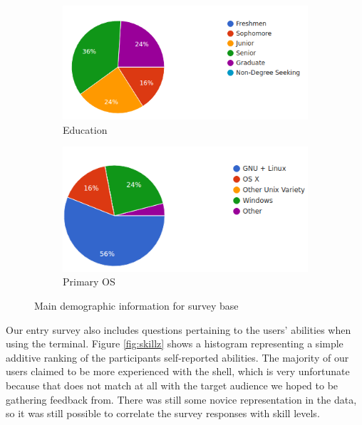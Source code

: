 \begin{figure}[ht]
  \begin{subfigure}[b]{0.45\textwidth}
    \includegraphics[width=\textwidth]{figures/stats/edu.png}
    \caption{Education}
    \label{fig:edu}
  \end{subfigure}
  \quad
  \begin{subfigure}[b]{0.45\textwidth}
    \includegraphics[width=\textwidth]{figures/stats/os.png}
    \caption{Primary OS}
    \label{fig:OS}
  \end{subfigure}
  \caption{Main demographic information for survey base}
\end{figure}

Our entry survey also includes questions pertaining to the users' abilities when
using the terminal. Figure \ref{fig:skillz} shows a histogram representing a
simple additive ranking of the participants self-reported abilities. The
majority of our users claimed to be more experienced with the shell, which is
very unfortunate because that does not match at all with the target audience we
hoped to be gathering feedback from. There was still some novice representation
in the data, so it was still possible to correlate the survey responses with
skill levels.

